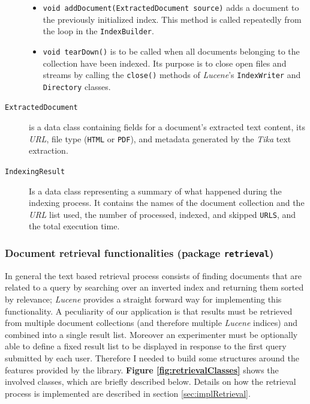 \documentclass[a4paper]{usiinfbachelorproject}
\begin{document}
\begin{description}
\begin{itemize}
                \item \texttt{void addDocument(ExtractedDocument source)} adds a document to the previously initialized
                      index. This method is called repeatedly from the loop in the \texttt{IndexBuilder}.

                \item \texttt{void tearDown()} is to be called when all documents belonging to the collection
                      have been indexed. Its purpose is to close open files and streams by calling the \texttt{close()}
                      methods of \emph{Lucene}'s \texttt{IndexWriter} and \texttt{Directory} classes.

            \end{itemize}

        \item[\texttt{ExtractedDocument}] is a data class containing fields for a document's extracted text content, its \emph{URL}, file type 
                (\texttt{HTML} or \texttt{PDF}), and metadata generated by the \emph{Tika} text extraction.

        \item[\texttt{IndexingResult}] Is a data class representing a summary of what happened during the indexing process.
                It contains the names of the document collection and the \emph{URL} list used, the number of
                processed, indexed, and skipped \texttt{URLS}, and the total execution time.


    \end{description}


\subsubsection{\textbf{Document retrieval functionalities (package \texttt{retrieval})}} \label{sec:archDataLayerRetrieval}

In general the text based retrieval process consists of finding documents that are related to a query by searching over an inverted index
 and returning them sorted by relevance; \emph{Lucene} provides a straight forward way for implementing this functionality. A peculiarity of
our application is that results must be retrieved from multiple document collections (and therefore multiple \emph{Lucene} indices) and
combined into a single result list. Moreover an experimenter must be optionally able to define a fixed result list to be displayed 
in response to the first query submitted by each user. Therefore I needed to build some structures around the features provided by the library. 
\textbf{Figure \ref{fig:retrievalClasses}} shows the involved classes, which are briefly described below. Details
on how the retrieval process is implemented are described in section \ref{sec:implRetrieval}.
\end{document}
